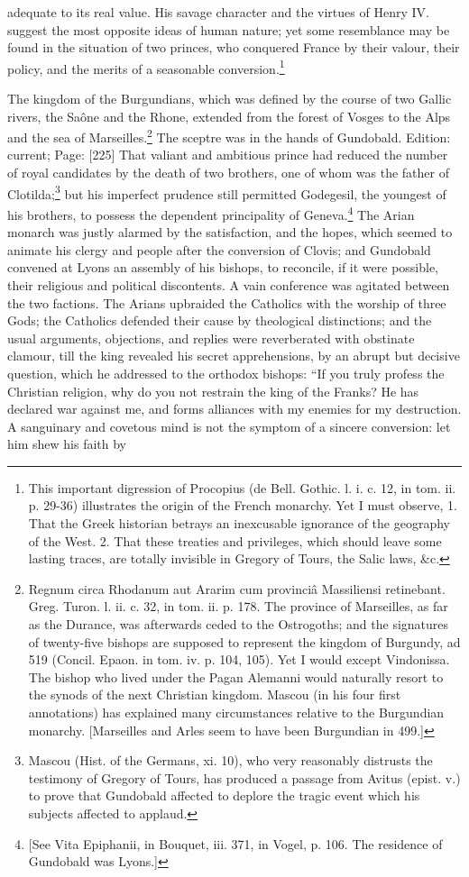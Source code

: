adequate to its real value. His savage character and the virtues of Henry IV. suggest the most opposite ideas of human nature; yet some resemblance may be found in the situation of two princes, who conquered France by their valour, their policy, and the merits of a seasonable conversion.\footnote{This important digression of Procopius (de Bell. Gothic. l. i. c. 12, in tom. ii. p. 29-36) illustrates the origin of the French monarchy. Yet I must observe, 1. That the Greek historian betrays an inexcusable ignorance of the geography of the West. 2. That these treaties and privileges, which should leave some lasting traces, are totally invisible in Gregory of Tours, the Salic laws, \&c.}

The kingdom of the Burgundians, which was defined by the course of two Gallic rivers, the Saône and the Rhone, extended from the forest of Vosges to the Alps and the sea of Marseilles.\footnote{Regnum circa Rhodanum aut Ararim cum provinciâ Massiliensi retinebant. Greg. Turon. l. ii. c. 32, in tom. ii. p. 178. The province of Marseilles, as far as the Durance, was afterwards ceded to the Ostrogoths; and the signatures of twenty-five bishops are supposed to represent the kingdom of Burgundy, ad 519 (Concil. Epaon. in tom. iv. p. 104, 105). Yet I would except Vindonissa. The bishop who lived under the Pagan Alemanni would naturally resort to the synods of the next Christian kingdom. Mascou (in his four first annotations) has explained many circumstances relative to the Burgundian monarchy. [Marseilles and Arles seem to have been Burgundian in 499.]} The sceptre was in the hands of Gundobald. Edition: current; Page: [225] That valiant and ambitious prince had reduced the number of royal candidates by the death of two brothers, one of whom was the father of Clotilda;\footnote{Mascou (Hist. of the Germans, xi. 10), who very reasonably distrusts the testimony of Gregory of Tours, has produced a passage from Avitus (epist. v.) to prove that Gundobald affected to deplore the tragic event which his subjects affected to applaud.} but his imperfect prudence still permitted Godegesil, the youngest of his brothers, to possess the dependent principality of Geneva.\footnote{[See Vita Epiphanii, in Bouquet, iii. 371, in Vogel, p. 106. The residence of Gundobald was Lyons.]} The Arian monarch was justly alarmed by the satisfaction, and the hopes, which seemed to animate his clergy and people after the conversion of Clovis; and Gundobald convened at Lyons an assembly of his bishops, to reconcile, if it were possible, their religious and political discontents. A vain conference was agitated between the two factions. The Arians upbraided the Catholics with the worship of three Gods; the Catholics defended their cause by theological distinctions; and the usual arguments, objections, and replies were reverberated with obstinate clamour, till the king revealed his secret apprehensions, by an abrupt but decisive question, which he addressed to the orthodox bishops: \texthebrew{“}If you truly profess the Christian religion, why do you not restrain the king of the Franks? He has declared war against me, and forms alliances with my enemies for my destruction. A sanguinary and covetous mind is not the symptom of a sincere conversion: let him shew his faith by 